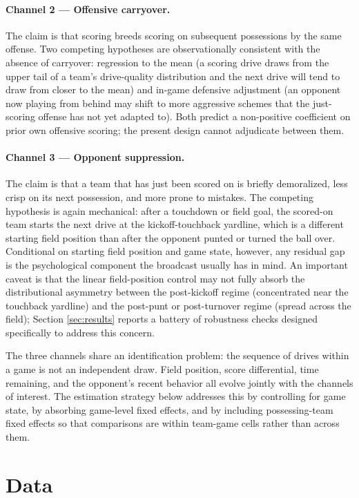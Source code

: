 \documentclass[11pt]{article}
\begin{document}
\paragraph{Channel 2 --- Offensive carryover.} The claim is that scoring
breeds scoring on subsequent possessions by the same offense. Two competing
hypotheses are observationally consistent with the absence of carryover:
regression to the mean (a scoring drive draws from the upper tail of a team's
drive-quality distribution and the next drive will tend to draw from closer
to the mean) and in-game defensive adjustment (an opponent now playing from
behind may shift to more aggressive schemes that the just-scoring offense has
not yet adapted to). Both predict a non-positive coefficient on prior own
offensive scoring; the present design cannot adjudicate between them.

\paragraph{Channel 3 --- Opponent suppression.} The claim is that a team that
has just been scored on is briefly demoralized, less crisp on its next
possession, and more prone to mistakes. The competing hypothesis is again
mechanical: after a touchdown or field goal, the scored-on team starts the
next drive at the kickoff-touchback yardline, which is a different starting
field position than after the opponent punted or turned the ball over.
Conditional on starting field position and game state, however, any residual
gap is the psychological component the broadcast usually has in mind. An
important caveat is that the linear field-position control may not fully
absorb the distributional asymmetry between the post-kickoff regime
(concentrated near the touchback yardline) and the post-punt or
post-turnover regime (spread across the field); Section
\ref{sec:results} reports a battery of robustness checks designed
specifically to address this concern.

The three channels share an identification problem: the sequence of drives
within a game is not an independent draw. Field position, score differential,
time remaining, and the opponent's recent behavior all evolve jointly with
the channels of interest. The estimation strategy below addresses this by
controlling for game state, by absorbing game-level fixed effects, and by
including possessing-team fixed effects so that comparisons are within
team-game cells rather than across them.

\section{Data}\label{sec:data}
\end{document}
